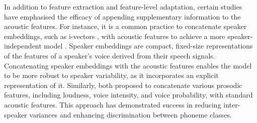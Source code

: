 In addition to feature extraction and feature-level adaptation, certain studies have emphasised the efficacy of appending supplementary information to the acoustic features. For instance, it is a common practice to concatenate speaker embeddings, such as i-vectors \cite{ivector}, with acoustic features to achieve a more speaker-independent model \cite{shivakumar2020transfer}. Speaker embeddings are compact, fixed-size representations of the features of a speaker's voice derived from their speech signals. Concatenating speaker embeddings with the acoustic features enables the model to be more robust to speaker variability, as it incorporates an explicit representation of it. Similarly, both \cite{prosody_feat,kadyan2023prosody} proposed to  concatenate various prosodic features, including loudness, voice intensity, and voice probability, with standard acoustic features. This approach has demonstrated success in reducing inter-speaker variances and enhancing discrimination between phoneme classes.

